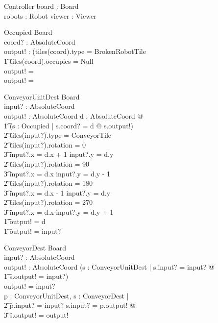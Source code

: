 \documentclass[12pt]{article}
\begin{document}
\begin{schema}{Controller}
board : Board \\
robots : \power Robot
viewer : Viewer
\end{schema}

\begin{schema}{Occupied}
\Xi Board \\
coord? : AbsoluteCoord \\
output! : \bool
\where
\IF (tiles(coord).type = BrokenRobotTile \; \; \vee \\ \t1
tiles(coord).occupies \not = Null \\
\THEN
output! = \true \\
\ELSE
output! = \false
\end{schema}

\begin{schema}{ConveyorUnitDest}
\Xi Board \\
input? : AbsoluteCoord \\
output! : AbsoluteCoord
\where
\IF \exists d : AbsoluteCoord @ \\ \t1
    (\exists s : Occupied | s.coord? = d @ \neg s.output!) \; \; \wedge \\ \t2
        tiles(input?).type = ConveyorTile \\ \t2
        tiles(input?).rotation = 0 \Rightarrow \\ \t3 input?.x = d.x + 1 \wedge input?.y = d.y \\ \t2
        tiles(input?).rotation = 90 \Rightarrow \\ \t3 input?.x = d.x \wedge input?.y = d.y - 1 \\ \t2
        tiles(input?).rotation = 180 \Rightarrow \\ \t3 input?.x = d.x - 1 \wedge input?.y = d.y \\ \t2
        tiles(input?).rotation = 270 \Rightarrow \\ \t3 input?.x = d.x \wedge input?.y = d.y + 1 \\ \t1
    \THEN output! = d \\ \t1
    \ELSE output! = input?
\end{schema}

\begin{schema}{ConveyorDest}
\Xi Board \\
input? : AbsoluteCoord \\
output! : AbsoluteCoord
\where
\IF (\exists s : ConveyorUnitDest | s.input? = input? @ \\ \t1 s.output! = input?) \\
\THEN output! = input? \\
\ELSE \exists p : ConveyorUnitDest, s : ConveyorDest | \\ \t2 p.input? = input? \wedge s.input? = p.output! @ \\ \t3 s.output! = output!
\end{schema}
\end{document}
